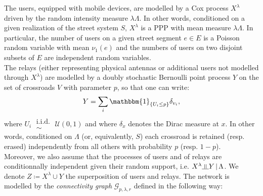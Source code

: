 \documentclass[10pt,a4paper]{amsart}
\theoremstyle{exampstyle}
\newtheorem{Proposition}{Proposition}
\newenvironment{Proof}{\noindent{\textit{Proof.}}}{%
\hspace*{\fill}$\Box$\par\vskip2ex}
\theoremstyle{exampnotations}
\newcommand{\indep}{\rotatebox[origin=c]{90}{$\models$}}
\begin{document}
The users, equipped with mobile devices, are modelled by a Cox process $X^{\lambda}$ driven by the random intensity measure $\lambda \Lambda$. In other words, conditioned on a given realization of the street system $S$, $X^{\lambda}$ is a PPP with mean measure $\lambda \Lambda$. In particular, the number of users on a given street segment $e \in E$ is a Poisson random variable with mean $\nu_{1}(e)$ and the numbers of users on two disjoint subsets of $E$ are independent random variables. \\
\indent The relays (either representing physical antennas or additional users not modelled through $X^{\lambda}$) are modelled by a doubly stochastic Bernoulli point process $Y$ on the set of crossroads $V$ with parameter $p$, so that one can write:
\begin{equation*}
Y = \sum_{i} \mathbbm{1}_{\lbrace U_{i} \leq p \rbrace } \delta_{v_{i}},
\end{equation*}
where $U_{i} \;\substack{ \text{i.i.d.} \\ \sim} \; \mathcal{U}(0,1)$ and where $\delta_{x}$ denotes the Dirac measure at $x$. In other words, conditioned on $\Lambda$ (or, equivalently, $S$) each crossroad is retained (resp. erased) independently from all others with probability $p$ (resp. $1-p$). \\
\noindent Moreover, we also assume that the processes of users and of relays  are conditionnally independent given their random support, i.e. $X^{\lambda} \indep Y \, \vert \,  \Lambda$. We denote $Z \coloneqq X^{\lambda} \cup Y$ the superposition of users and relays. 
The network is modelled by the \emph{connectivity graph} $\mathcal{G}_{p,\lambda,r}$ defined in the following way:
\end{document}
